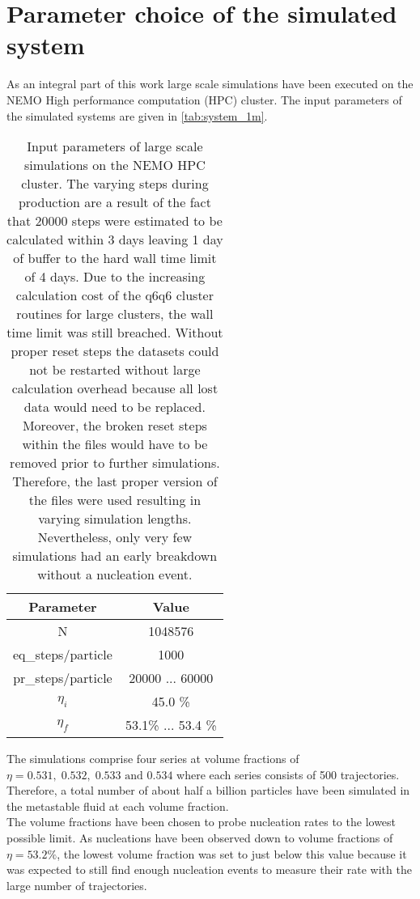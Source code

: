 
\label{chp:data_analysis}
\section{Parameter choice of the simulated system}
\label{sec:system_choice}
As an integral part of this work large scale simulations have been executed on the NEMO High performance computation (HPC) cluster. The input parameters of the simulated systems are given in \autoref{tab:system_1m}.

\begin{table}[h]
\centering
\begin{tabular}{c|c}
Parameter & Value \\ \hline
N & 1048576 \\
eq\_steps/particle & 1000 \\
pr\_steps/particle & 20000  ... 60000 \\
$\eta_i$ & 45.0 \% \\
$\eta_f$ & 53.1\% ... 53.4 \% \\
\end{tabular}
\caption[Simulation parameters of data production systems]{Input parameters of large scale simulations on the NEMO HPC cluster. The varying steps during production are a result of the fact that 20000 steps were estimated to be calculated within 3 days leaving 1 day of buffer to the hard wall time limit of 4 days. Due to the increasing calculation cost of the q6q6 cluster routines for large clusters, the wall time limit was still breached. Without proper reset steps the datasets could not be restarted without large calculation overhead because all lost data would need to be replaced. Moreover, the broken reset steps within the files would have to be removed prior to further simulations. Therefore, the last proper version of the files were used resulting in varying simulation lengths. Nevertheless, only very few simulations had an early breakdown without a nucleation event.}
\label{tab:system_1m}
\end{table}

The simulations comprise four series at volume fractions of $\eta = 0.531,\;0.532,\;0.533 \text{ and }0.534$ where each series consists of 500 trajectories. Therefore, a total number of about half a billion particles have been simulated in the metastable fluid at each volume fraction.\\

The volume fractions have been chosen to probe nucleation rates to the lowest possible limit. As nucleations have been observed down to volume fractions of $\eta=53.2\%$, the lowest volume fraction was set to just below this value because it was expected to still find enough nucleation events to measure their rate with the large number of trajectories.\\

